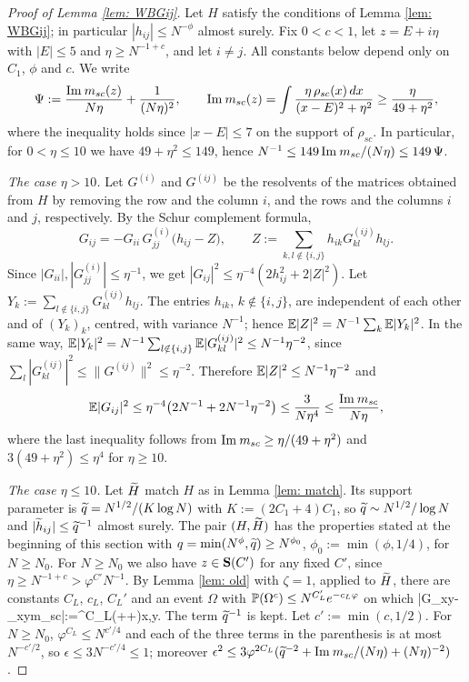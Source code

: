 \begin{proof}[Proof of Lemma \ref{lem: WBGij}]
Let $H$ satisfy the conditions of Lemma \ref{lem: WBGij}; in particular $|h_{ij}|\le N^{-\phi}$ almost surely. Fix $0<c<1$, let $z=E+i\eta$ with $|E|\le5$ and $\eta\ge N^{-1+c}$, and let $i\ne j$. All constants below depend only on $C_1$, $\phi$ and $c$. We write
$$
\Psi:=\frac{\mathrm{Im}\: m_{sc}(z)}{N\eta}+\frac1{(N\eta)^2},\qquad\mathrm{Im}\: m_{sc}(z)=\int\frac{\eta\,\rho_{sc}(x)\,dx}{(x-E)^2+\eta^2}\ge\frac{\eta}{49+\eta^2},
$$
where the inequality holds since $|x-E|\le7$ on the support of $\rho_{sc}$. In particular, for $0<\eta\le10$ we have $49+\eta^2\le149$, hence $N^{-1}\le149\,\mathrm{Im}\: m_{sc}/(N\eta)\le149\,\Psi$.

{\it The case $\eta>10$.} Let $G^{(i)}$ and $G^{(ij)}$ be the resolvents of the matrices obtained from $H$ by removing the row and the column $i$, and the rows and the columns $i$ and $j$, respectively. By the Schur complement formula,
$$
G_{ij}=-G_{ii}\,G^{(i)}_{jj}\Big(h_{ij}-Z\Big),\qquad Z:=\sum_{k,l\notin\{i,j\}}h_{ik}G^{(ij)}_{kl}h_{lj}.
$$
Since $|G_{ii}|,|G^{(i)}_{jj}|\le\eta^{-1}$, we get $|G_{ij}|^2\le\eta^{-4}(2h_{ij}^2+2|Z|^2)$. Let $Y_k:=\sum_{l\notin\{i,j\}}G^{(ij)}_{kl}h_{lj}$. The entries $h_{ik}$, $k\notin\{i,j\}$, are independent of each other and of $(Y_k)_k$, centred, with variance $N^{-1}$; hence $\mathbb{E}|Z|^2=N^{-1}\sum_k\mathbb{E}|Y_k|^2$. In the same way, $\mathbb{E}|Y_k|^2=N^{-1}\sum_{l\notin\{i,j\}}\mathbb{E}|G^{(ij)}_{kl}|^2\le N^{-1}\eta^{-2}$, since $\sum_l|G^{(ij)}_{kl}|^2\le\|G^{(ij)}\|^2\le\eta^{-2}$. Therefore $\mathbb{E}|Z|^2\le N^{-1}\eta^{-2}$ and
$$
\mathbb{E}|G_{ij}|^2\le\eta^{-4}\big(2N^{-1}+2N^{-1}\eta^{-2}\big)\le\frac3{N\eta^4}\le\frac{\mathrm{Im}\: m_{sc}}{N\eta},
$$
where the last inequality follows from $\mathrm{Im}\: m_{sc}\ge\eta/(49+\eta^2)$ and $3(49+\eta^2)\le\eta^4$ for $\eta\ge10$.

{\it The case $\eta\le10$.} Let $\widetilde H$ match $H$ as in Lemma \ref{lem: match}. Its support parameter is $\widetilde q=N^{1/2}/(K\log N)$ with $K:=(2C_1+4)C_1$, so $\widetilde q\sim N^{1/2}/\log N$ and $|\widetilde h_{ij}|\le\widetilde q^{-1}$ almost surely. The pair $(H,\widetilde H)$ has the properties stated at the beginning of this section with $q=\min(N^{\phi},\widetilde q)\ge N^{\phi_0}$, $\phi_0:=\min(\phi,1/4)$, for $N\ge N_0$. For $N\ge N_0$ we also have $z\in{\bf S}(C')$ for any fixed $C'$, since $\eta\ge N^{-1+c}>\varphi^{C'}N^{-1}$. By Lemma \ref{lem: old} with $\zeta=1$, applied to $\widetilde H$, there are constants $C_L$, $c_L$, $C_L'$ and an event $\Omega$ with $\mathbb{P}(\Omega^c)\le N^{C_L'}e^{-c_L\varphi}$ on which
\be\label{tddc}
|\wt G_{xy}-\delta_{xy}m_{sc}|\leq \epsilon:=\varphi^{C_L}\left(++\right)\quad{}x,y.
\ee
The term $\widetilde q^{-1}$ is kept. Let $c':=\min(c,1/2)$. For $N\ge N_0$, $\varphi^{C_L}\le N^{c'/4}$ and each of the three terms in the parenthesis is at most $N^{-c'/2}$, so $\epsilon\le3N^{-c'/4}\le1$; moreover $\epsilon^2\le3\varphi^{2C_L}(\widetilde q^{-2}+\mathrm{Im}\: m_{sc}/(N\eta)+(N\eta)^{-2})$.


\end{proof}
